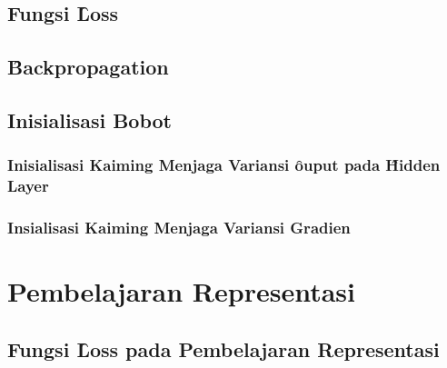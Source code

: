     \subsection{Fungsi \f{Loss}}
        
    \subsection{\f{Backpropagation}}

    \subsection{Inisialisasi Bobot}
    \label{sec:kaiminginit}


        \subsubsection{Inisialisasi Kaiming Menjaga Variansi \f{ouput} pada \f{Hidden Layer}}

        \subsubsection{Insialisasi Kaiming Menjaga Variansi Gradien}



\section{Pembelajaran Representasi}

    \subsection{Fungsi \f{Loss} pada Pembelajaran Representasi}













        

